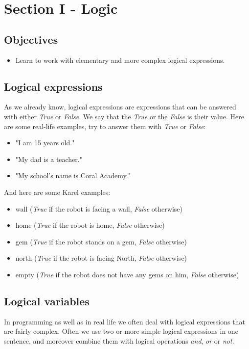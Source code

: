 \documentclass[article,A4,12pt]{llncs}
\begin{document}
{{{{\section{Section I - Logic}

\subsection{Objectives} 
 
\begin{itemize}
\item Learn to work with elementary and more complex logical expressions.
\end{itemize}

\subsection{Logical expressions}
As we already know, logical expressions are expressions that can be answered with either {\em True} or 
{\em False}. We say that the {\em True} or the {\em False} is their value. Here are some 
real-life examples, try to answer them with {\em True} or {\em False}:

\begin{itemize}
\item "I am 15 years old."
\item "My dad is a teacher."
\item "My school's name is Coral Academy."
\end{itemize}
And here are some Karel examples:
\begin{itemize}
\item wall ({\em True} if the robot is facing a wall, {\em False} otherwise)
\item home ({\em True} if the robot is home, {\em False} otherwise)
\item gem ({\em True} if the robot stands on a gem, {\em False} otherwise)
\item north ({\em True} if the robot is facing North, {\em False} otherwise)
\item empty ({\em True} if the robot does not have any gems on him, {\em False} otherwise)
\end{itemize}

\subsection{Logical variables}

In programming as well as in real life we often deal with logical expressions that are 
fairly complex. Often we use two or more simple logical expressions in one sentence, 
and moreover combine them with logical operations {\em and}, {\em or} or {\em not}.

}}}}
\end{document}
